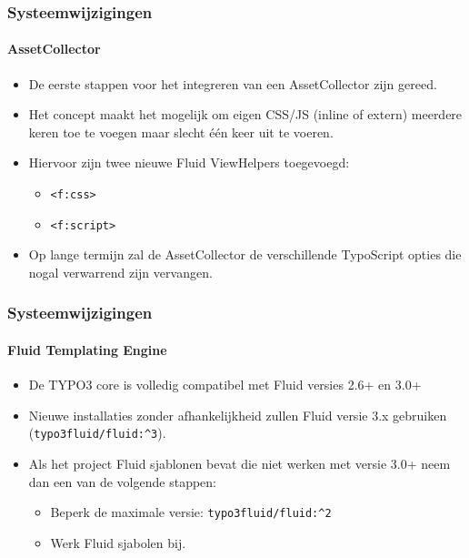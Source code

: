 
\begin{frame}[fragile]
	\frametitle{Systeemwijzigingen}
	\framesubtitle{AssetCollector}

	\begin{itemize}
		\item De eerste stappen voor het integreren van een AssetCollector zijn gereed.
		\item Het concept maakt het mogelijk om eigen CSS/JS (inline of extern) meerdere
			keren toe te voegen maar slecht één keer uit te voeren.
		\item Hiervoor zijn twee nieuwe Fluid ViewHelpers toegevoegd:
			\begin{itemize}
				\item \texttt{<f:css>}
				\item \texttt{<f:script>}
			\end{itemize}
		\item Op lange termijn zal de AssetCollector de verschillende TypoScript opties
			die nogal verwarrend zijn vervangen.
	\end{itemize}

\end{frame}


\begin{frame}[fragile]
	\frametitle{Systeemwijzigingen}
	\framesubtitle{Fluid Templating Engine}

	\begin{itemize}
		\item De TYPO3 core is volledig compatibel met Fluid versies 2.6+ en 3.0+
		\item Nieuwe installaties zonder afhankelijkheid zullen Fluid versie 3.x gebruiken
			(\texttt{typo3fluid/fluid:\^{}3}).
		\item Als het project Fluid sjablonen bevat die niet werken met versie 3.0+ neem dan
			een van de volgende stappen:

			\begin{itemize}
				\item Beperk de maximale versie: \texttt{typo3fluid/fluid:\^{}2}
				\item Werk Fluid sjabolen bij.
			\end{itemize}

	\end{itemize}

\end{frame}

